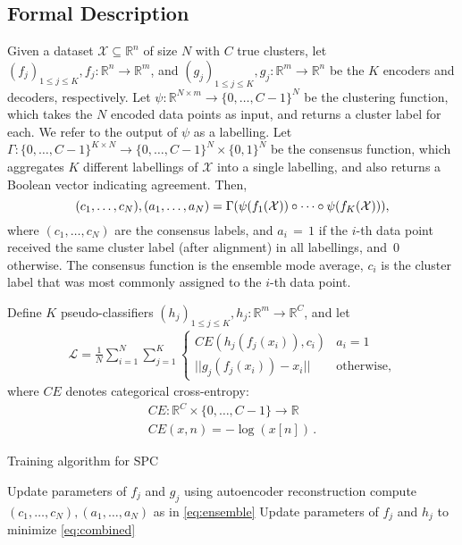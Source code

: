 \documentclass[runningheads]{llncs}
\begin{document}
\subsection{Formal Description} \label{subsec:formal-description}
Given a dataset $\mathcal{X} \subseteq \mathbb{R}^n$ of size $N$ with $C$ true clusters, let $(f_j)_{1 \leq j \leq K},  f_j:\mathbb{R}^n \rightarrow \mathbb{R}^m$, and $(g_j)_{1 \leq j \leq K}, g_j:  \mathbb{R}^m \rightarrow \mathbb{R}^n$ be the $K$ encoders and decoders, respectively. 
Let $\psi: \mathbb{R}^{N \times m} \rightarrow \{0,\dots,C-1\}^N$ be the clustering function, which takes the $N$ encoded data points as input, and returns a cluster label for each. We refer to the output of $\psi$ as a labelling. Let $\Gamma: \{0,\dots,C-1\}^{K \times N} \rightarrow \{0,\dots,C-1\}^N \times \{0,1\}^N$ be the consensus function, which aggregates $K$ different labellings of $\mathcal{X}$ into a single labelling, and also returns a Boolean vector indicating agreement. Then, 
\begin{equation} \label{eq:ensemble}
{\small(c_1, \dots, c_N), (a_1, \dots, a_N) = \Gamma(\psi(f_1(\mathcal{X})) \circ \cdots \circ \psi(f_K(\mathcal{X}))),}
\end{equation}
where $(c_1, \dots, c_N)$ are the consensus labels, and $a_i\,{ =}\, 1$ if the $i$-th data point received the same cluster label (after alignment) in all labellings, and~$0$ otherwise. The consensus function is the ensemble mode average, $c_i$ is the cluster label that was most commonly assigned to the $i$-th data point. 

Define $K$ pseudo-classifiers \mbox{$(h_j)_{1 \leq j \leq K}, h_j: \mathbb{R}^m \rightarrow \mathbb{R}^C$}, and let 
\begin{gather} \label{eq:combined}
\mathcal{L} = \frac{1}{N}\sum_{i=1}^N\sum_{j=1}^K 
\begin{cases} 
CE(h_j(f_j(x_i)), c_i) & a_i = 1 \\
||g_j(f_j(x_i)) - x_i|| & \text{otherwise,}
\end{cases} 
\end{gather}
where $CE$ denotes categorical cross-entropy:
\begin{gather*}
CE: \mathbb{R}^C \times \{0, \dots, C-1\} \rightarrow \mathbb{R} \\
CE(x,n) = -\log (x[n]) \,.
\end{gather*}


\begin{algorithm}[t]
\begin{algorithmic}
\caption {Training algorithm for SPC} \label{alg:method}
    \STATE Update parameters of $f_j$ and $g_j$ using autoencoder reconstruction
\ENDFOR
{}
    \STATE compute $(c_1, \dots, c_N), (a_1, \dots, a_N)$ as in \eqref{eq:ensemble}
        \STATE Update parameters of $f_j$ and $h_j$ to minimize \eqref{eq:combined}
    \ENDFOR
\ENDWHILE
\end{algorithmic}
\end{algorithm}
\end{document}
